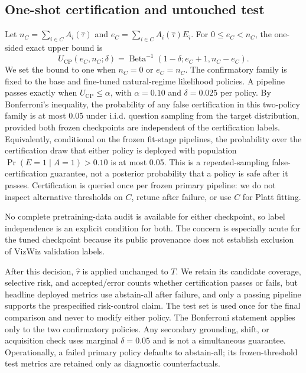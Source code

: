 \documentclass[11pt]{article}
\newcommand{\TargetRisk}{0.10}
\newcommand{\FamilyFailureProb}{0.05}
\newcommand{\PrimaryFailureProb}{0.025}
\newcommand{\ExploratoryFailureProb}{0.05}
\begin{document}
\subsection{One-shot certification and untouched test}

Let $n_C=\sum_{i\in C}A_i(\hat\tau)$ and
$e_C=\sum_{i\in C}A_i(\hat\tau)E_i$.  For $0\leq e_C<n_C$, the one-sided exact
upper bound is
\begin{equation}
 U_{\mathrm{CP}}(e_C,n_C;\delta)
 =\operatorname{Beta}^{-1}(1-\delta;e_C+1,n_C-e_C).
 \label{eq:cp}
\end{equation}
We set the bound to one when $n_C=0$ or $e_C=n_C$.  The confirmatory family is
fixed to the base and fine-tuned natural-regime likelihood policies.  A pipeline
passes exactly when $U_{\mathrm{CP}}\leq\alpha$, with $\alpha=\TargetRisk$ and
$\delta=\PrimaryFailureProb$ per policy.  By Bonferroni's inequality, the
probability of any false certification in this two-policy family is at most
\FamilyFailureProb{} under i.i.d. question sampling from the target distribution,
provided both frozen checkpoints are independent of the certification labels.
Equivalently, conditional on the frozen fit-stage pipelines, the probability over
the certification draw that either policy is deployed with population
$\Pr(E=1\mid A=1)>\TargetRisk$ is at most \FamilyFailureProb.  This is a
repeated-sampling false-certification guarantee, not a posterior probability that
a policy is safe after it passes.  Certification is queried once per frozen primary pipeline:
we do not inspect alternative thresholds on $C$, retune after failure, or use $C$
for Platt fitting.

No complete pretraining-data audit is available for either checkpoint, so label
independence is an explicit condition for both.  The concern is especially acute for
the tuned checkpoint because its public provenance does not establish exclusion of
VizWiz validation labels.

After this decision, $\hat\tau$ is applied unchanged to $T$.  We retain its candidate
coverage, selective risk, and accepted/error counts whether certification passes or
fails, but headline deployed metrics use abstain-all after failure, and only a
passing pipeline supports the prespecified risk-control claim.
The test set is used once for the final comparison and never to modify either
policy.  The Bonferroni statement applies only to the two confirmatory policies.
Any secondary grounding, shift, or acquisition check uses marginal
$\delta=\ExploratoryFailureProb$ and is not a simultaneous guarantee.
Operationally, a failed primary policy defaults to abstain-all; its frozen-threshold
test metrics are retained only as diagnostic counterfactuals.
\end{document}
